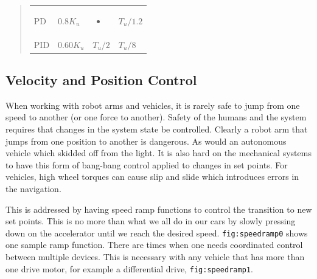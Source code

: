 \begin{quote}
\begin{longtable}[]{@{}llll@{}}
\begin{minipage}[t]{0.18\columnwidth}\raggedright
PD\strut
\end{minipage} & \begin{minipage}[t]{0.22\columnwidth}\raggedright
\(0.8K_u\)\strut
\end{minipage} & \begin{minipage}[t]{0.22\columnwidth}\raggedright
\begin{itemize}
\tightlist
\item
\end{itemize}\strut
\end{minipage} & \begin{minipage}[t]{0.25\columnwidth}\raggedright
\(T_u / 1.2\)\strut
\end{minipage}\tabularnewline
\begin{minipage}[t]{0.18\columnwidth}\raggedright
PID\strut
\end{minipage} & \begin{minipage}[t]{0.22\columnwidth}\raggedright
\(0.60K_u\)\strut
\end{minipage} & \begin{minipage}[t]{0.22\columnwidth}\raggedright
\(T_u/2\)\strut
\end{minipage} & \begin{minipage}[t]{0.25\columnwidth}\raggedright
\(T_u / 8\)\strut
\end{minipage}\tabularnewline
\bottomrule
\end{longtable}
\end{quote}

\hypertarget{velocity-and-position-control}{%
\subsection{Velocity and Position
Control}\label{velocity-and-position-control}}

When working with robot arms and vehicles, it is rarely safe to jump
from one speed to another (or one force to another). Safety of the
humans and the system requires that changes in the system state be
controlled. Clearly a robot arm that jumps from one position to another
is dangerous. As would an autonomous vehicle which skidded off from the
light. It is also hard on the mechanical systems to have this form of
bang-bang control applied to changes in set points. For vehicles, high
wheel torques can cause slip and slide which introduces errors in the
navigation.

This is addressed by having speed ramp functions to control the
transition to new set points. This is no more than what we all do in our
cars by slowly pressing down on the accelerator until we reach the
desired speed. \texttt{fig:speedramp0} shows one sample ramp function.
There are times when one needs coordinated control between multiple
devices. This is necessary with any vehicle that has more than one drive
motor, for example a differential drive, \texttt{fig:speedramp1}.

